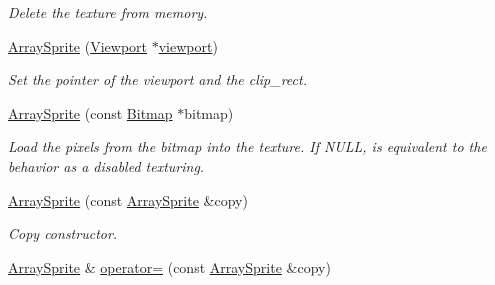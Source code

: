\begin{DoxyCompactItemize}
\begin{DoxyCompactList}\small\item\em Delete the texture from memory. \item\end{DoxyCompactList}\item 
\hyperlink{class_f2_c_1_1_array_sprite_a412ffea7593257bb399c109e9f0662f2}{ArraySprite} (\hyperlink{class_f2_c_1_1_viewport}{Viewport} $\ast$\hyperlink{class_f2_c_1_1_array_sprite_acbf1252a3782ba0a09c14b0b52fd48b8}{viewport})
\begin{DoxyCompactList}\small\item\em Set the pointer of the viewport and the clip\_\-rect. \item\end{DoxyCompactList}\item 
\hyperlink{class_f2_c_1_1_array_sprite_a2caa4bd4c8ca99dab916ddb6b9d12666}{ArraySprite} (const \hyperlink{class_f2_c_1_1_bitmap}{Bitmap} $\ast$bitmap)
\begin{DoxyCompactList}\small\item\em Load the pixels from the bitmap into the texture. If NULL, is equivalent to the behavior as a disabled texturing. \item\end{DoxyCompactList}\item 
\hypertarget{class_f2_c_1_1_array_sprite_a6a647fab4e8b1ea85911f339085a3ac2}{
\hyperlink{class_f2_c_1_1_array_sprite_a6a647fab4e8b1ea85911f339085a3ac2}{ArraySprite} (const \hyperlink{class_f2_c_1_1_array_sprite}{ArraySprite} \&copy)}
\label{class_f2_c_1_1_array_sprite_a6a647fab4e8b1ea85911f339085a3ac2}

\begin{DoxyCompactList}\small\item\em Copy constructor. \item\end{DoxyCompactList}\item 
\hypertarget{class_f2_c_1_1_array_sprite_afdf5f7d8a5255e25b1e9536c55344e09}{
\hyperlink{class_f2_c_1_1_array_sprite}{ArraySprite} \& \hyperlink{class_f2_c_1_1_array_sprite_afdf5f7d8a5255e25b1e9536c55344e09}{operator=} (const \hyperlink{class_f2_c_1_1_array_sprite}{ArraySprite} \&copy)}
\label{class_f2_c_1_1_array_sprite_afdf5f7d8a5255e25b1e9536c55344e09}


\end{DoxyCompactItemize}
